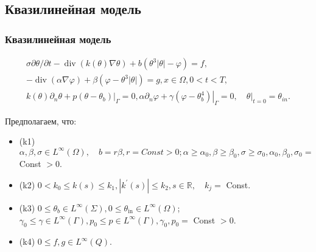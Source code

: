 \subsection{Квазилинейная модель}\label{subsec:ql}
\begin{frame}
    \frametitle{Квазилинейная модель}
    \begin{gather}
        \sigma \partial \theta / \partial t
        -\operatorname{div}(k(\theta) \nabla \theta)
        +b\left(\theta^{3}|\theta|-\varphi\right)=f, \label{eq:1_6:1}\\
        -\operatorname{div}(\alpha \nabla \varphi)
        +\beta\left(\varphi-\theta^{3}|\theta|\right)=g, x \in \Omega, 0<t<T, \label{eq:1_6:2}\\
        k(\theta) \partial_{n} \theta+\left.p\left(\theta-\theta_{b}\right)\right|_{\Gamma}=0,
        \alpha \partial_{n} \varphi
        +\left.\gamma\left(\varphi-\theta_{b}^{4}\right)\right|_{\Gamma}=0,
        \left.\quad \theta\right|_{t=0}=\theta_{in}.\label{eq:1_6:3}
    \end{gather}

    Предполагаем, что:
    \begin{itemize}
        \item (k1) $\alpha, \beta, \sigma \in L^{\infty}(\Omega),
        \quad b=r \beta, r = Const > 0; \alpha \geq \alpha_{0}, \beta \geq \beta_{0},
        \sigma \geq \sigma_{0}, \alpha_{0}, \beta_{0}, \sigma_{0}=$ Const $>0$.

        \item (k2) $0<k_{0} \leq k(s) \leq k_{1},\left|k^{\prime}(s)\right| \leq k_{2},
        s \in \mathbb{R}, \quad k_{j}=$ Const.

        \item (k3) $0 \leq \theta_{b} \in L^{\infty}(\Sigma), 0 \leq \theta_{\text{in}}
        \in L^{\infty}(\Omega)$; $\gamma_{0} \leq \gamma \in L^{\infty}(\Gamma), p_{0}
        \leq p \in L^{\infty}(\Gamma), \gamma_{0}, p_{0}=$ Const $>0$.

        \item (k4) $0 \leq f, g \in L^{\infty}(Q).$
    \end{itemize}

\end{frame}

